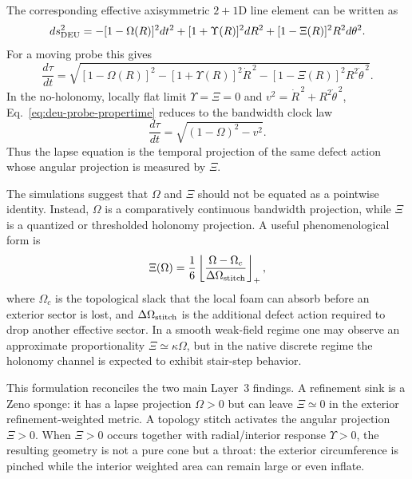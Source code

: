 The corresponding effective axisymmetric $2+1$D line element can be written as
\begin{equation}\label{eq:deu-projected-metric}
  ds_{\rm DEU}^2
  =-[1-\Omega(R)]^2dt^2
  +[1+\Upsilon(R)]^2dR^2
  +[1-\Xi(R)]^2R^2d\theta^2 .
\end{equation}
For a moving probe this gives
\begin{equation}\label{eq:deu-probe-propertime}
  \frac{d\tau}{dt}
  =\sqrt{
     [1-\Omega(R)]^2
     -[1+\Upsilon(R)]^2\dot R^{\,2}
     -[1-\Xi(R)]^2 R^2 \dot\theta^{\,2}}
  .
\end{equation}
In the no-holonomy, locally flat limit $\Upsilon=\Xi=0$ and
$v^2=\dot R^{\,2}+R^2\dot\theta^{\,2}$, Eq.~\eqref{eq:deu-probe-propertime}
reduces to the bandwidth clock law
\begin{equation}
  \frac{d\tau}{dt}=\sqrt{(1-\Omega)^2-v^2}.
\end{equation}
Thus the lapse equation is the temporal projection of the same defect action
whose angular projection is measured by $\Xi$.

The simulations suggest that $\Omega$ and $\Xi$ should not be equated as a
pointwise identity.  Instead, $\Omega$ is a comparatively continuous bandwidth
projection, while $\Xi$ is a quantized or thresholded holonomy projection.  A
useful phenomenological form is
\begin{equation}\label{eq:stitch-threshold}
  \Xi(\Omega)
  =\frac{1}{6}
   \left\lfloor
     \frac{\Omega-\Omega_c}{\Delta\Omega_{\rm stitch}}
   \right\rfloor_+,
\end{equation}
where $\Omega_c$ is the topological slack that the local foam can absorb before
an exterior sector is lost, and $\Delta\Omega_{\rm stitch}$ is the additional
defect action required to drop another effective sector.  In a smooth weak-field
regime one may observe an approximate proportionality $\Xi\simeq\kappa\Omega$,
but in the native discrete regime the holonomy channel is expected to exhibit
stair-step behavior.

This formulation reconciles the two main Layer~3 findings.  A refinement sink is
a Zeno sponge: it has a lapse projection $\Omega>0$ but can leave $\Xi\simeq0$ in
the exterior refinement-weighted metric.  A topology stitch activates the angular
projection $\Xi>0$.  When $\Xi>0$ occurs together with radial/interior response
$\Upsilon>0$, the resulting geometry is not a pure cone but a throat: the
exterior circumference is pinched while the interior weighted area can remain
large or even inflate.
